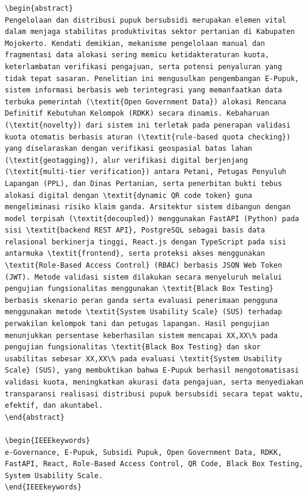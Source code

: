 \documentclass[conference]{IEEEtran}
\begin{document}
\begin{lstlisting}
\begin{abstract}
Pengelolaan dan distribusi pupuk bersubsidi merupakan elemen vital dalam menjaga stabilitas produktivitas sektor pertanian di Kabupaten Mojokerto. Kendati demikian, mekanisme pengelolaan manual dan fragmentasi data alokasi sering memicu ketidakteraturan kuota, keterlambatan verifikasi pengajuan, serta potensi penyaluran yang tidak tepat sasaran. Penelitian ini mengusulkan pengembangan E-Pupuk, sistem informasi berbasis web terintegrasi yang memanfaatkan data terbuka pemerintah (\textit{Open Government Data}) alokasi Rencana Definitif Kebutuhan Kelompok (RDKK) secara dinamis. Kebaharuan (\textit{novelty}) dari sistem ini terletak pada penerapan validasi kuota otomatis berbasis aturan (\textit{rule-based quota checking}) yang diselaraskan dengan verifikasi geospasial batas lahan (\textit{geotagging}), alur verifikasi digital berjenjang (\textit{multi-tier verification}) antara Petani, Petugas Penyuluh Lapangan (PPL), dan Dinas Pertanian, serta penerbitan bukti tebus alokasi digital dengan \textit{dynamic QR code token} guna mengeliminasi risiko klaim ganda. Arsitektur sistem dibangun dengan model terpisah (\textit{decoupled}) menggunakan FastAPI (Python) pada sisi \textit{backend REST API}, PostgreSQL sebagai basis data relasional berkinerja tinggi, React.js dengan TypeScript pada sisi antarmuka \textit{frontend}, serta proteksi akses menggunakan \textit{Role-Based Access Control} (RBAC) berbasis JSON Web Token (JWT). Metode validasi sistem dilakukan secara menyeluruh melalui pengujian fungsionalitas menggunakan \textit{Black Box Testing} berbasis skenario peran ganda serta evaluasi penerimaan pengguna menggunakan metode \textit{System Usability Scale} (SUS) terhadap perwakilan kelompok tani dan petugas lapangan. Hasil pengujian menunjukkan persentase keberhasilan sistem mencapai XX,XX\% pada pengujian fungsionalitas \textit{Black Box Testing} dan skor usabilitas sebesar XX,XX\% pada evaluasi \textit{System Usability Scale} (SUS), yang membuktikan bahwa E-Pupuk berhasil mengotomatisasi validasi kuota, meningkatkan akurasi data pengajuan, serta menyediakan transparansi realisasi distribusi pupuk bersubsidi secara tepat waktu, efektif, dan akuntabel.
\end{abstract}

\begin{IEEEkeywords}
e-Governance, E-Pupuk, Subsidi Pupuk, Open Government Data, RDKK, FastAPI, React, Role-Based Access Control, QR Code, Black Box Testing, System Usability Scale.
\end{IEEEkeywords}


\end{lstlisting}
\end{document}
